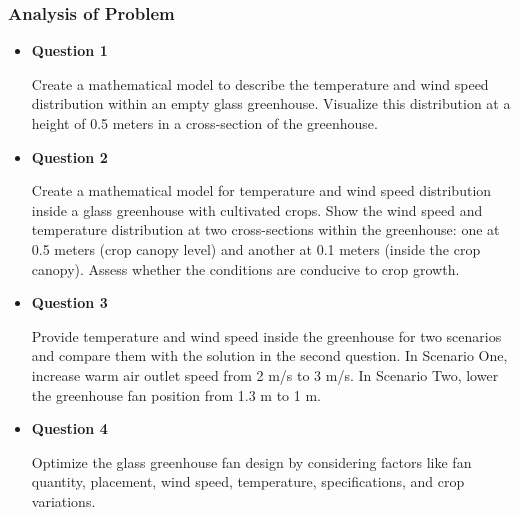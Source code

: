 \documentclass{apmcmthesis}
\begin{document}
\subsubsection{Analysis of Problem}
\begin{itemize}
  \item \textbf{Question 1}
  
  Create a mathematical model to describe the temperature and wind speed distribution within an empty glass greenhouse. Visualize this distribution at a height of 0.5 meters in a cross-section of the greenhouse.
  \item \textbf{Question 2}

  Create a mathematical model for temperature and wind speed distribution inside a glass greenhouse with cultivated crops. Show the wind speed and temperature distribution at two cross-sections within the greenhouse: one at 0.5 meters (crop canopy level) and another at 0.1 meters (inside the crop canopy). Assess whether the conditions are conducive to crop growth.
  \item \textbf{Question 3}

  Provide temperature and wind speed inside the greenhouse for two scenarios and compare them with the solution in the second question. In Scenario One, increase warm air outlet speed from 2 m/s to 3 m/s. In Scenario Two, lower the greenhouse fan position from 1.3 m to 1 m.
  \item \textbf{Question 4}

  Optimize the glass greenhouse fan design by considering factors like fan quantity, placement, wind speed, temperature, specifications, and crop variations.
\end{itemize}
\end{document}
